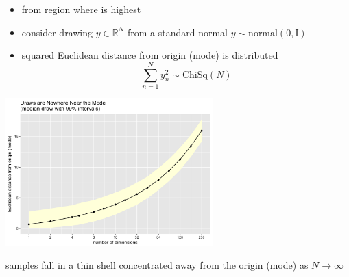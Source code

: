 \documentclass[9pt]{report}
\begin{document}
\begin{itemize}
\item from region where  is highest
\item consider drawing $y \in \mathbb{R}^N$ from a standard normal $y \sim \textrm{normal}(0, \textrm{I})$
\item squared Euclidean distance from origin (mode) is distributed
  \[
    \sum_{n = 1}^N y_n^2 \sim \textrm{ChiSq}(N)
  \]
\end{itemize}

\begin{center}
  \includegraphics[width=0.6\textwidth]{img/normal-thin-shell.png}
\end{center}
\begin{subitemize}
  \item samples fall in a thin shell concentrated
    away from the origin (mode) as $N \rightarrow \infty$
  \end{subitemize}
\end{document}
